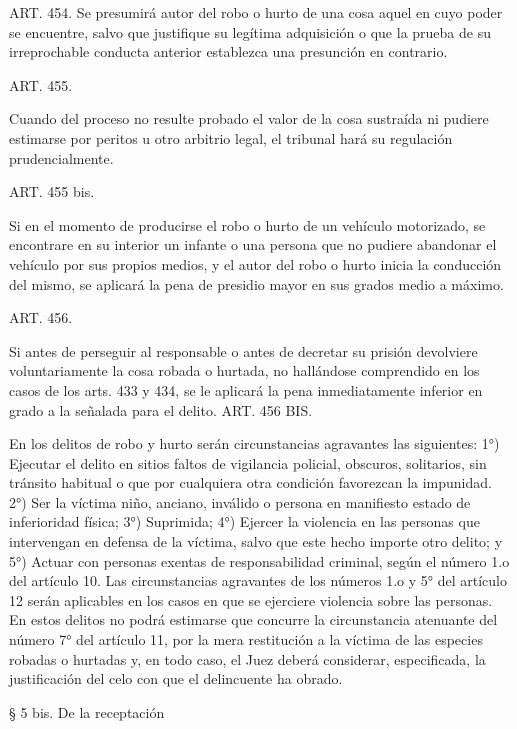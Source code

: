    ART. 454.
    Se presumirá autor del robo o hurto de una cosa aquel en cuyo poder se encuentre, salvo que justifique su legítima adquisición o que la prueba de su irreprochable conducta anterior establezca una presunción en contrario.


    ART. 455.

    Cuando del proceso no resulte probado el valor de la cosa sustraída ni pudiere estimarse por peritos u otro arbitrio legal, el tribunal hará su regulación prudencialmente.



    ART. 455 bis.

    Si en el momento de producirse el robo o hurto de un vehículo motorizado, se encontrare en su interior un infante o una persona que no pudiere abandonar el vehículo por sus propios medios, y el autor del robo o hurto inicia la conducción del mismo, se aplicará la pena de presidio mayor en sus grados medio a máximo.



    ART. 456.

    Si antes de perseguir al responsable o antes de decretar su prisión devolviere voluntariamente la cosa robada o hurtada, no hallándose comprendido en los casos de los arts. 433 y 434, se le aplicará la pena inmediatamente inferior en grado a la señalada para el delito.
    ART. 456 BIS.

    En los delitos de robo y hurto serán circunstancias agravantes las siguientes:
    1°) Ejecutar el delito en sitios faltos de vigilancia policial, obscuros, solitarios, sin tránsito habitual o que por cualquiera otra condición favorezcan la impunidad.
    2°) Ser la víctima niño, anciano, inválido o persona en manifiesto estado de inferioridad física;
    3°) Suprimida;
    4°) Ejercer la violencia en las personas que intervengan en defensa de la víctima, salvo que este hecho importe otro delito; y
    5°) Actuar con personas exentas de responsabilidad criminal, según el número 1.o del artículo 10.
    Las circunstancias agravantes de los números 1.o y 5° del artículo 12 serán aplicables en los casos en que se ejerciere violencia sobre las personas.
    En estos delitos no podrá estimarse que concurre la circunstancia atenuante del número 7° del artículo 11, por la mera restitución a la víctima de las especies robadas o hurtadas y, en todo caso, el Juez deberá considerar, especificada, la justificación del celo con que el delincuente ha obrado.


    § 5 bis. De la receptación

